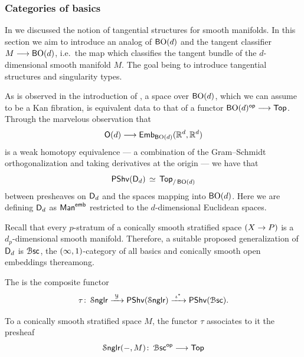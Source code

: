 \medskip

\medskip

\subsubsection{Categories of basics}

In  we discussed the notion of tangential structures for smooth manifolds. In this section we aim to introduce an analog of $\operatorname{{\mathsf BO}}(d)$ and the tangent classifier $M \longrightarrow \operatorname{{\mathsf BO}}(d)$, i.e.\ the map which classifies the tangent bundle of the $d$-dimensional smooth manifold $M$. The goal being to introduce tangential structures and singularity types.

As is observed in the introduction of \cite{AFT1}, a space over $\operatorname{{\mathsf BO}}(d)$, which we can assume to be a Kan fibration, is equivalent data to that of a functor $\operatorname{{\mathsf BO}}(d)^{\mathsf{op}} \longrightarrow \operatorname{\mathsf{Top}}$. Through the marvelous observation that 
\begin{equation}
    \mathsf O(d) \longrightarrow \operatorname{\mathsf{Emb}}_{\operatorname{{\mathsf BO}}(d)}(\mathbb R^{d},\mathbb R^{d})
\end{equation} 
is a weak homotopy equivalence — a combination of the Gram--Schmidt orthogonalization and taking derivatives at the origin — we have that 
\begin{equation}
    \operatorname{\sf PShv}(\mathsf D_{d}) \, \simeq \, \operatorname{\mathsf{Top}}_{/\operatorname{{\mathsf BO}}(d)}
\end{equation}
between presheaves on $\mathsf D_d$ and the spaces mapping into $\operatorname{{\mathsf BO}}(d)$. Here we are defining $\mathsf D_d$ as $\operatorname{\sf Man}^{\operatorname{\mathsf{emb}}}$ restricted to the $d$-dimensional Euclidean spaces. 

Recall that every $p$-stratum of a conically smooth stratified space $(X \rightarrow P)$ is a $d_{p}$-dimensional smooth manifold. Therefore, a suitable proposed generalization of $\mathsf D_d$ is $\operatorname{\mathcal B\mathsf{sc}}$, the $(\operatorname{\infty},1)$-category of all basics and conically smooth open embeddings thereamong.

\begin{definition}\cite[Definition~1.1.3]{AFT1}
    The  is the composite functor
    \begin{equation}
        \tau \colon \operatorname{\mathcal S{\sf nglr}} \xrightarrow{\,\,\mathcal Y\,\,} \operatorname{\sf PShv}(\operatorname{\mathcal S{\sf nglr}}) \xrightarrow{\,\,\iota^*\,\,} \operatorname{\sf PShv}(\operatorname{\mathcal B\mathsf{sc}}).
    \end{equation}
\end{definition}

\begin{remark}
To a conically smooth stratified space $M$, the functor $\tau$ associates to it the presheaf
\begin{equation}
    \operatorname{\mathcal S{\sf nglr}}(-,M)\colon \operatorname{\mathcal B\mathsf{sc}}^{\mathsf{op}} \longrightarrow \operatorname{\mathsf{Top}}
\end{equation}
\end{remark}

